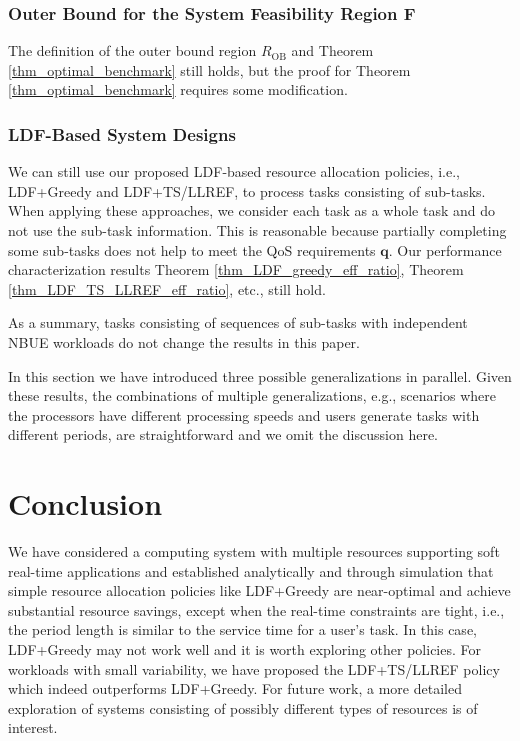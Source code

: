\documentclass[prodmode,acmtompecs]{acmsmall}
\newcommand{\reqvec}{\mathbf{q}}
\newcommand{\myComments}[1]{}
\newif\iftompecsonly
\newif\iftompecsextended
\newcommand{\tompecsonlyStart}{\iftompecsonly \myComments{TOMPECS only version: }}
\newcommand{\tompecsextendedStart}{\iftompecsextended  \myComments{TOMPECS extended version: }}
\newcommand{\commentEnd}{\myComments{End}}
\begin{document}
\subsubsection{Outer Bound for the System Feasibility Region F}

The definition of the outer bound region $R_{\text{OB}}$ and Theorem \ref{thm_optimal_benchmark} still holds, but the proof for Theorem \ref{thm_optimal_benchmark} requires some modification. 
\tompecsonlyStart
See the extended version of this paper \cite{EXT} for the details. 
\commentEnd\fi
\tompecsextendedStart
See Appendix \ref{appendix_pf_R_OB_subtask_model} for the details. 
\commentEnd\fi

\subsubsection{LDF-Based System Designs}

We can still use our proposed LDF-based resource allocation policies, i.e., LDF+Greedy and LDF+TS/LLREF, to process tasks consisting of sub-tasks. When applying these approaches, we consider each task as a whole task and do not use the sub-task information. This is reasonable because partially completing some sub-tasks does not help to meet the QoS requirements $\reqvec$. Our performance characterization results Theorem \ref{thm_LDF_greedy_eff_ratio}, Theorem \ref{thm_LDF_TS_LLREF_eff_ratio}, etc., still hold. 

As a summary, tasks consisting of sequences of sub-tasks with independent NBUE workloads do not change the results in this paper. 

In this section we have introduced three possible generalizations in parallel. Given these results, the combinations of multiple generalizations, e.g., scenarios where the processors have different processing speeds and users generate tasks with different periods, are straightforward and we omit the discussion here. 
\commentEnd\fi


\section{Conclusion}
We have considered a computing system with multiple resources supporting soft real-time applications and established analytically and through simulation that simple resource allocation policies like LDF+Greedy are near-optimal and achieve substantial resource savings, except when the real-time constraints are tight, i.e., the period length is similar to the service time for a user's task. 
In this case, LDF+Greedy may not work well and it is worth exploring other policies. 
For workloads with small variability, we have proposed the LDF+TS/LLREF policy which indeed outperforms LDF+Greedy. 
For future work, a more detailed exploration of systems consisting of possibly different types of resources is of interest. 
\end{document}
